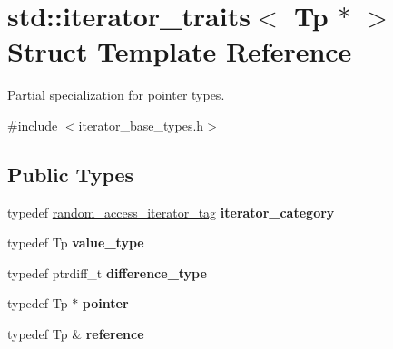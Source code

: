 \hypertarget{structstd_1_1iterator__traits_3_01Tp_01_5_01_4}{}\section{std\+:\+:iterator\+\_\+traits$<$ Tp $\ast$ $>$ Struct Template Reference}
\label{structstd_1_1iterator__traits_3_01Tp_01_5_01_4}


Partial specialization for pointer types.  




{\ttfamily \#include $<$iterator\+\_\+base\+\_\+types.\+h$>$}

\subsection*{Public Types}
\begin{DoxyCompactItemize}
\item 
typedef \hyperlink{structstd_1_1random__access__iterator__tag}{random\+\_\+access\+\_\+iterator\+\_\+tag} {\bfseries iterator\+\_\+category}\hypertarget{structstd_1_1iterator__traits_3_01Tp_01_5_01_4_ac3c34447d9d5d995b962b4573408d019}{}\label{structstd_1_1iterator__traits_3_01Tp_01_5_01_4_ac3c34447d9d5d995b962b4573408d019}

\item 
typedef Tp {\bfseries value\+\_\+type}\hypertarget{structstd_1_1iterator__traits_3_01Tp_01_5_01_4_abe99575632d808c12e770315668d1670}{}\label{structstd_1_1iterator__traits_3_01Tp_01_5_01_4_abe99575632d808c12e770315668d1670}

\item 
typedef ptrdiff\+\_\+t {\bfseries difference\+\_\+type}\hypertarget{structstd_1_1iterator__traits_3_01Tp_01_5_01_4_a5fd9399390a9769c6bcdff105dc2dac2}{}\label{structstd_1_1iterator__traits_3_01Tp_01_5_01_4_a5fd9399390a9769c6bcdff105dc2dac2}

\item 
typedef Tp $\ast$ {\bfseries pointer}\hypertarget{structstd_1_1iterator__traits_3_01Tp_01_5_01_4_aa6121d2a0718ac25e263431576aab7ef}{}\label{structstd_1_1iterator__traits_3_01Tp_01_5_01_4_aa6121d2a0718ac25e263431576aab7ef}

\item 
typedef Tp \& {\bfseries reference}\hypertarget{structstd_1_1iterator__traits_3_01Tp_01_5_01_4_aba817193ffd3b4b30fcde5ae18cb1e3d}{}\label{structstd_1_1iterator__traits_3_01Tp_01_5_01_4_aba817193ffd3b4b30fcde5ae18cb1e3d}

\end{DoxyCompactItemize}


